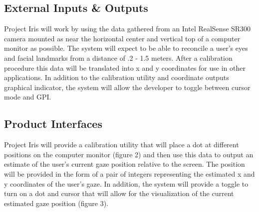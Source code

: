 \subsection{External Inputs \& Outputs}
Project Iris will work by using the data gathered from an Intel RealSense SR300 camera mounted as near the horizontal center and vertical top of a computer monitor as possible. The system will expect to be able to reconcile a user's eyes and facial landmarks from a distance of .2 - 1.5 meters. After a calibration procedure this data will be translated into x and y coordinates for use in other applications. In addition to the calibration utility and coordinate outputs graphical indicator, the system will allow the developer to toggle between cursor mode and GPI.

\subsection{Product Interfaces}
Project Iris will provide a calibration utility that will place a dot at different positions on the computer monitor (figure 2) and then use this data to output an estimate of the user's current gaze position relative to the screen. The position will be provided in the form of a pair of integers representing the estimated x and y coordinates of the user's gaze. In addition, the system will provide a toggle to turn on a dot and cursor that will allow for the visualization of the current estimated gaze position (figure 3).